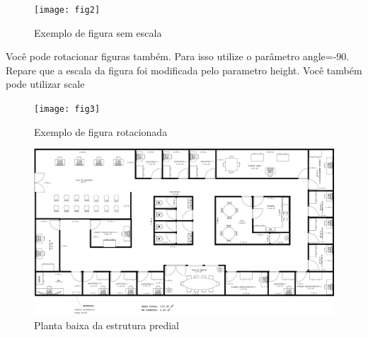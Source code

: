 \documentclass[	DIV=calc,%
							paper=a4,%
							fontsize=12pt,%
							onecolumn]{scrartcl}	 					%
\begin{document}
\begin{figure}
	\centering
	\texttt{[image: fig2]}
	\caption{Exemplo de figura sem escala}
	\label{fig2}
\end{figure}

Você pode rotacionar figuras também. Para isso utilize o parâmetro angle=-90. Repare que a escala da figura foi modificada pelo parametro height. Você também pode utilizar scale

\begin{figure}
	\centering
	\texttt{[image: fig3]}
	\caption{Exemplo de figura rotacionada}
	\label{fig3}
\end{figure}

\begin{figure}
	\includegraphics[height=\textwidth,angle=-90,scale=0.8]{planta2d}
	\caption{Planta baixa da estrutura predial}
	\label{planta2d}
\end{figure}
\end{document}

